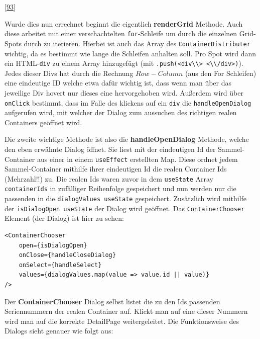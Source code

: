 \documentclass[
    headings=optiontotocandhead,%
    twoside,
    numbers=noenddot,%
    12pt, %
    titlepage, %
    parskip=full, %
    listof=leveldown, 
    numbers=noenddot, %
    a4paper,DIV=14,
    BCOR=15mm,
]{scrbook}
\newcommand{\passthrough}[1]{#1}
\begin{document}
{[}\protect\hyperlink{ref-gpt-ContainerDistributorScript}{93}{]}

Wurde dies nun errechnet beginnt die eigentlich \textbf{renderGrid}
Methode. Auch diese arbeitet mit einer verschachtelten
\passthrough{\lstinline!for!}-Schleife um durch die einzelnen Grid-Spots
durch zu iterieren. Hierbei ist auch das Array des
\passthrough{\lstinline!ContainerDistributer!} wichtig, da es bestimmt
wie lange die Schleifen anhalten soll. Pro Spot wird dann ein
HTML-\passthrough{\lstinline!div!} zu einem Array hinzugefügt (mit
\passthrough{\lstinline!.push(<div\\> <\\/div>)!}). Jedes dieser Divs
hat durch die Rechnung \(Row - Column\) (aus den For Schleifen) eine
eindeutige ID welche etwa dafür wichtig ist, dass wenn man über das
jeweilige Div hovert nur dieses eine hervorgehoben wird. Außerdem wird
über \passthrough{\lstinline!onClick!} bestimmt, dass im Falle des
klickens auf ein \passthrough{\lstinline!div!} die
\passthrough{\lstinline!handleOpenDialog!} aufgerufen wird, mit welcher
der Dialog zum aussuchen des richtigen realen Containers geöffnet wird.

Die zweite wichtige Methode ist also die \textbf{handleOpenDialog}
Methode, welche den eben erwähnte Dialog öffnet. Sie liest mit der
eindeutigen Id der Sammel-Container aus einer in einem
\passthrough{\lstinline!useEffect!} erstellten Map. Diese ordnet jedem
Sammel-Container mithilfe ihrer eindeutigen Id die realen Container Ids
(Mehrzahl!!) zu. Die realen Ids waren zuvor in dem
\passthrough{\lstinline!useState!} Array
\passthrough{\lstinline!containerIds!} in zufälliger Reihenfolge
gespeichert und nun werden nur die passenden in die
\passthrough{\lstinline!dialogValues useState!} gespeichert. Zusätzlich
wird mithilfe der \passthrough{\lstinline!isDialogOpen useState!} der
Dialog wird geöffnet. Das \passthrough{\lstinline!ContainerChooser!}
Element (der Dialog) ist hier zu sehen:

\begin{lstlisting}[caption={ContainerChooser Komponente Nutzung}]
<ContainerChooser
    open={isDialogOpen}
    onClose={handleCloseDialog}
    onSelect={handleSelect}
    values={dialogValues.map(value => value.id || value)}
/>
\end{lstlisting}

Der \textbf{ContainerChooser} Dialog selbst listet die zu den Ids
passenden Seriennummern der realen Container auf. Klickt man auf eine
dieser Nummern wird man auf die korrekte DetailPage weitergeleitet. Die
Funktionsweise des Dialogs sieht genauer wie folgt aus:
\end{document}
